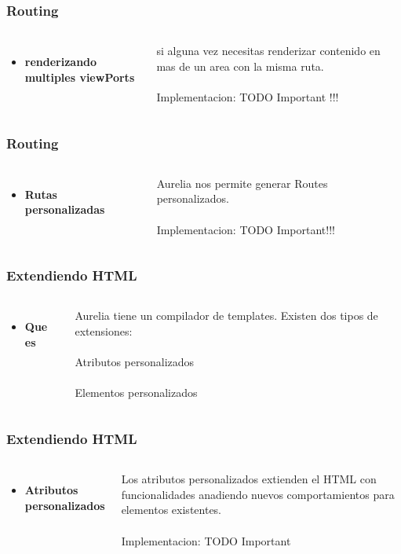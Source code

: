 \documentclass{beamer}
\begin{document}
\begin{frame}
\frametitle{Routing}
\begin{columns}[c]
\begin{itemize}
\item \textbf{renderizando multiples viewPorts}
\end{itemize}
si alguna vez necesitas renderizar contenido en mas de un area con la misma ruta.
\\~\\
Implementacion: TODO Important !!!
\end{columns}
\end{frame}
\begin{frame}
\frametitle{Routing}
\begin{columns}[c]
\begin{itemize}
\item \textbf{Rutas personalizadas}
\end{itemize}

Aurelia nos permite generar Routes personalizados.
\\~\\
Implementacion: TODO Important!!!
\end{columns}
\end{frame}
\begin{frame}
\frametitle{Extendiendo HTML}
\begin{columns}[c]
\begin{itemize}
\item \textbf{Que es}
\end{itemize}

Aurelia tiene un compilador de templates. Existen dos tipos de extensiones:
\\~\\
Atributos personalizados
\\~\\
Elementos personalizados
\end{columns}
\end{frame}
\begin{frame}
\frametitle{Extendiendo HTML}
\begin{columns}[c]
\begin{itemize}
\item \textbf{Atributos personalizados}
\end{itemize}

Los atributos personalizados extienden el HTML con funcionalidades anadiendo nuevos comportamientos para elementos
existentes.
\\~\\
Implementacion: TODO Important
\end{columns}
\end{frame}
\end{document}
